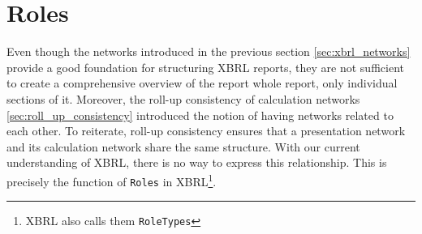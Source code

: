 \label{sec:roles}
\section{Roles}

Even though the networks introduced in the previous section \ref{sec:xbrl_networks} provide a good foundation for structuring XBRL reports, 
they are not sufficient to create a comprehensive overview of the report whole report, only individual sections of it.
Moreover, the roll-up consistency of calculation networks \ref{sec:roll_up_consistency} introduced the notion of having networks related to each other.
To reiterate, roll-up consistency ensures that a presentation network and its calculation network share the same structure.
With our current understanding of XBRL, there is no way to express this relationship.
This is precisely the function of \texttt{Roles} in XBRL\footnote{XBRL also calls them \texttt{RoleTypes}}.






